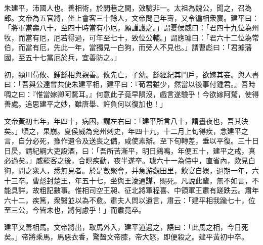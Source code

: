 \begin{pinyinscope}
 
 
 朱建平，沛國人也。善相術，於閭巷之間，效驗非一。太祖為魏公，聞之，召為郎。文帝為五官將，坐上會客三十餘人，文帝問己年壽，又令徧相衆賔。建平曰：「將軍當壽八十，至四十時當有小厄，願謹護之。」謂夏侯威曰：「君四十九位為州牧，而當有厄，厄若得過，可年至七十，致位公輔。」謂應璩曰：「君六十二位為常伯，而當有厄，先此一年，當獨見一白狗，而旁人不見也。」謂曹彪曰：「君據藩國，至五十七當厄於兵，宜善防之。」
 
 
 
 
 初，潁川荀攸、鍾繇相與親善。攸先亡，子幼。繇經紀其門戶，欲嫁其妾。與人書曰：「吾與公達曾共使朱建平相，建平曰：『荀君雖少，然當以後事付鍾君。』吾時啁之曰：『惟當嫁卿阿騖耳。』何意此子竟早隕沒，戲言遂驗乎！今欲嫁阿騖，使得善處。追思建平之妙，雖唐舉、許負何以復加也！」
 
 
 
 
 文帝黃初七年，年四十，病困，謂左右曰：「建平所言八十，謂晝夜也，吾其決矣。」頃之，果崩。夏侯威為兖州刺史，年四十九，十二月上旬得疾，念建平之言，自分必死，豫作遺令及送喪之備，咸使素辦。至下旬轉差，垂以平復。三十日日昃，請紀綱大吏設酒，曰：「吾所苦漸平，明日鷄鳴，年便五十，建平之戒，真必過矣。」威罷客之後，合瞑疾動，夜半遂卒。璩六十一為侍中，直省內，欻見白狗，問之衆人，悉無見者。於是數聚會，并急游觀田里，飲宴自娛，過期一年，六十三卒。曹彪封楚王，年五十七，坐與王淩通謀，賜死。凡說此輩，無不如言，不能具詳，故粗記數事。惟相司空王昶、征北將軍程喜、中領軍王肅有蹉跌云。肅年六十二，疾篤，衆醫並以為不愈。肅夫人問以遺言，肅云：「建平相我踰七十，位至三公，今皆未也，將何慮乎！」而肅竟卒。
 
 
 
 
 建平又善相馬。文帝將出，取馬外入，建平道遇之，語曰：「此馬之相，今日死矣。」帝將乘馬，馬惡衣香，驚齧文帝膝，帝大怒，即便殺之。建平黃初中卒。
 
 
\end{pinyinscope}